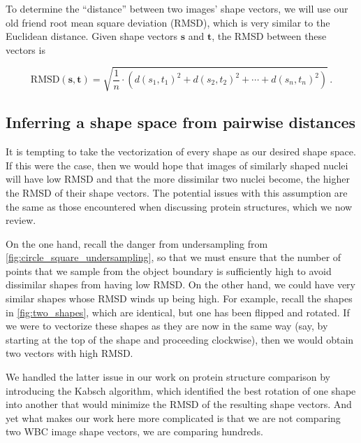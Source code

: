 \begin{note}\end{note}

To determine the ``distance'' between two images' shape vectors, we will use our old friend root mean square deviation (RMSD), which is very similar to the Euclidean distance. Given shape vectors $\mathbf{s}$ and $\mathbf{t}$, the RMSD between these vectors is

$$\text{RMSD}(\mathbf{s}, \mathbf{t}) = \sqrt{\dfrac{1}{n} \cdot (d(s_1, t_1)^2 + d(s_2, t_2)^2 + \cdots + d(s_n, t_n)^2)}\,. $$

\FloatBarrier
{}
\subsection{Inferring a shape space from pairwise distances}

It is tempting to take the vectorization of every shape as our desired shape space. If this were the case, then we would hope that images of similarly shaped nuclei will have low RMSD and that the more dissimilar two nuclei become, the higher the RMSD of their shape vectors. The potential issues with this assumption are the same as those encountered when discussing protein structures, which we now review.

On the one hand, recall the danger from undersampling from \autoref{fig:circle_square_undersampling}, so that we must ensure that the number of points that we sample from the object boundary is sufficiently high to avoid dissimilar shapes from having low RMSD. On the other hand, we could have very similar shapes whose RMSD winds up being high. For example, recall the shapes in \autoref{fig:two_shapes}, which are identical, but one has been flipped and rotated. If we were to vectorize these shapes as they are now in the same way (say, by starting at the top of the shape and proceeding clockwise), then we would obtain two vectors with high RMSD.

We handled the latter issue in our work on protein structure comparison by introducing the Kabsch algorithm, which identified the best rotation of one shape into another that would minimize the RMSD of the resulting shape vectors. And yet what makes our work here more complicated is that we are not comparing  two WBC image shape vectors, we are comparing hundreds.

